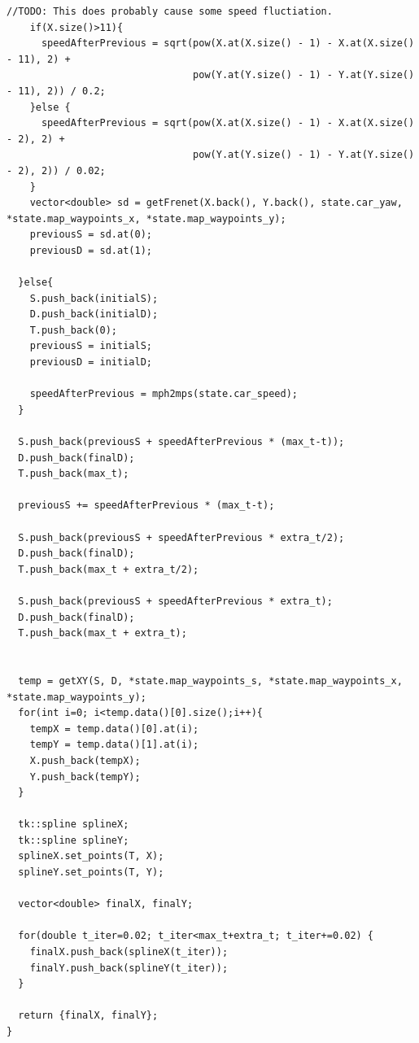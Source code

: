\documentclass[12pt,a4paper]{article}
\begin{document}
\begin{lstlisting}[title=Lane change state path generation]
    //TODO: This does probably cause some speed fluctiation.
    if(X.size()>11){
      speedAfterPrevious = sqrt(pow(X.at(X.size() - 1) - X.at(X.size() - 11), 2) +
                                pow(Y.at(Y.size() - 1) - Y.at(Y.size() - 11), 2)) / 0.2;
    }else {
      speedAfterPrevious = sqrt(pow(X.at(X.size() - 1) - X.at(X.size() - 2), 2) +
                                pow(Y.at(Y.size() - 1) - Y.at(Y.size() - 2), 2)) / 0.02;
    }
    vector<double> sd = getFrenet(X.back(), Y.back(), state.car_yaw, *state.map_waypoints_x, *state.map_waypoints_y);
    previousS = sd.at(0);
    previousD = sd.at(1);

  }else{
    S.push_back(initialS);
    D.push_back(initialD);
    T.push_back(0);
    previousS = initialS;
    previousD = initialD;

    speedAfterPrevious = mph2mps(state.car_speed);
  }

  S.push_back(previousS + speedAfterPrevious * (max_t-t));
  D.push_back(finalD);
  T.push_back(max_t);

  previousS += speedAfterPrevious * (max_t-t);

  S.push_back(previousS + speedAfterPrevious * extra_t/2);
  D.push_back(finalD);
  T.push_back(max_t + extra_t/2);

  S.push_back(previousS + speedAfterPrevious * extra_t);
  D.push_back(finalD);
  T.push_back(max_t + extra_t);


  temp = getXY(S, D, *state.map_waypoints_s, *state.map_waypoints_x, *state.map_waypoints_y);
  for(int i=0; i<temp.data()[0].size();i++){
    tempX = temp.data()[0].at(i);
    tempY = temp.data()[1].at(i);
    X.push_back(tempX);
    Y.push_back(tempY);
  }

  tk::spline splineX;
  tk::spline splineY;
  splineX.set_points(T, X);
  splineY.set_points(T, Y);

  vector<double> finalX, finalY;

  for(double t_iter=0.02; t_iter<max_t+extra_t; t_iter+=0.02) {
    finalX.push_back(splineX(t_iter));
    finalY.push_back(splineY(t_iter));
  }

  return {finalX, finalY};
}



\end{lstlisting}
\end{document}
